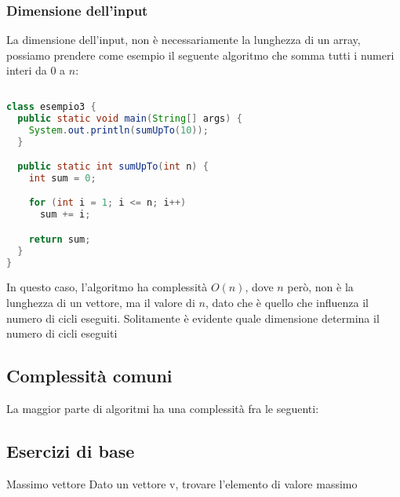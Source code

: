 \subsubsection{Dimensione dell'input}
La dimensione dell'input, non è necessariamente la lunghezza di un array, possiamo prendere come esempio il seguente algoritmo che somma tutti i numeri interi da 0 a $ n $:
\begin{lstlisting}[language = java, frame = none]
  
class esempio3 {
  public static void main(String[] args) {
    System.out.println(sumUpTo(10));
  }

  public static int sumUpTo(int n) {
    int sum = 0;

    for (int i = 1; i <= n; i++)
      sum += i;

    return sum;
  }
}
\end{lstlisting}
In questo caso, l'algoritmo ha complessità $ O\left(n\right) $, dove $ n $ però, non è la lunghezza di un vettore, ma il valore di $ n $, dato che è quello che influenza il numero di cicli eseguiti. Solitamente è evidente quale dimensione determina il numero di cicli eseguiti

\subsection{Complessità comuni}
La maggior parte di algoritmi ha una complessità fra le seguenti:
\vskip3mm
\vskip3mm


\subsection{Esercizi di base}
\begin{esercizio}{Massimo vettore}
	Dato un vettore {\ttfamily v}, trovare l'elemento di valore massimo
\end{esercizio}

